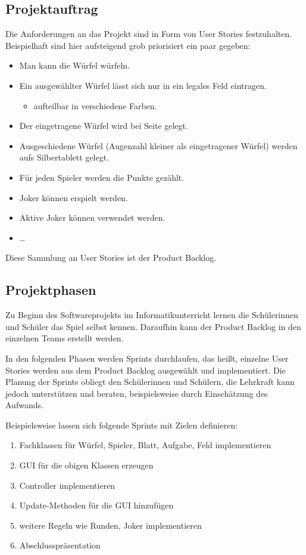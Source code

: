 \documentclass[a4paper,12pt]{article}
\newcommand{\sus}{Schülerinnen und Schüler}
\newcommand{\susn}{\sus n}
\begin{document}
\subsection{Projektauftrag}
    Die Anforderungen an das Projekt sind in Form von User Stories festzuhalten.
    Beispielhaft sind hier aufsteigend grob priorisiert ein paar gegeben:
    \begin{itemize}
        \item Man kann die Würfel würfeln.
        \item Ein ausgewählter Würfel lässt sich nur in ein legales Feld eintragen.
        \begin{itemize}
            \item aufteilbar in verschiedene Farben.
        \end{itemize}
        \item Der eingetragene Würfel wird bei Seite gelegt.
        \item Ausgeschiedene Würfel (Augenzahl kleiner als eingetragener Würfel) werden aufs Silbertablett gelegt.
        \item Für jeden Spieler werden die Punkte gezählt.
        \item Joker können erspielt werden.
        \item Aktive Joker können verwendet werden.
        \item \dots
    \end{itemize}

    Diese Sammlung an User Stories ist der Product Backlog.
    
\subsection{Projektphasen}
    Zu Beginn des Softwareprojekts im Informatikunterricht lernen die \sus{} das Spiel selbst kennen.
    Daraufhin kann der Product Backlog in den einzelnen Teams erstellt werden.
    
    In den folgenden Phasen werden Sprints durchlaufen, das heißt, einzelne User Stories werden aus dem 
    Product Backlog ausgewählt und implementiert.
    Die Planung der Sprints obliegt den \susn{}, die Lehrkraft kann jedoch unterstützen und beraten,
    beispielsweise durch Einschätzung des Aufwands.
    
    Beispielsweise lassen sich folgende Sprints mit Zielen definieren:
    \begin{enumerate}
        \item Fachklassen für Würfel, Spieler, Blatt, Aufgabe, Feld implementieren
        \item GUI für die obigen Klassen erzeugen
        \item Controller implementieren
        \item Update-Methoden für die GUI hinzufügen
        \item weitere Regeln wie Runden, Joker implementieren
        \item Abschlusspräsentation
    \end{enumerate}
\end{document}
